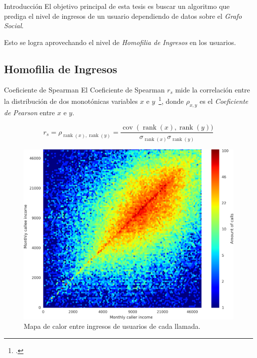 \documentclass{beamer}
\DeclareMathOperator{\rank}{rank}
\DeclareMathOperator{\cov}{cov}
\begin{document}
\begin{frame}{Introducción}
	El objetivo principal de esta tesis es buscar un algoritmo que prediga el nivel de ingresos de un usuario dependiendo de datos sobre el \emph{Grafo Social}.

	Esto se logra aprovechando el nivel de \emph{Homofilia de Ingresos} en los usuarios.
\end{frame}


\subsection{Homofilia de Ingresos}

\begin{frame}{Coeficiente de Spearman}
	El Coeficiente de Spearman $r_s$ mide la correlación entre la distribución de dos monotónicas variables $x$ e $y$~\footcite{statistical_analysis}, donde $\rho_{x, y}$ es el \emph{Coeficiente de Pearson} entre $x$ e $y$.


	\begin{equation*}
		r_s = \rho_{\rank\left(x\right), \rank\left(y\right)} = \frac{\cov\left(\rank\left(x\right), \rank\left(y\right))}{\sigma_{\rank(x)} \sigma_{\rank(y)}}
	\end{equation*}

\end{frame}

\begin{frame}
	\begin{figure}
		\includegraphics[width=.8\framewidth]{heatmap.png}
		\caption{Mapa de calor entre ingresos de usuarios de cada llamada.}
	\end{figure}
\end{frame}
\end{document}
